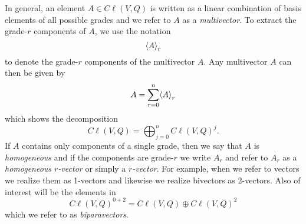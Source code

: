 In general, an element $A \in C\ell(V,Q)$ is written as a linear combination of basis elements of all possible grades and we refer to $A$ as a \emph{multivector}.  To extract the grade-$r$ components of $A$, we use the notation
\begin{equation}
\proj{r}{A}
\end{equation}
to denote the grade-$r$ components of the multivector $A$. Any multivector $A$ can then be given by
\begin{equation}
A = \sum_{r=0}^n \proj{r}{A}
\end{equation}
which shows the decomposition
\begin{equation}
C\ell(V,Q) = \bigoplus_{j=0}^n C\ell(V,Q)^j.
\end{equation}
If $A$ contains only components of a single grade, then we say that $A$ is \emph{homogeneous} and if the components are grade-$r$ we write $A_r$ and refer to $A_r$ as a \emph{homogeneous $r$-vector} or simply a \emph{$r$-vector}.  For example, when we refer to vectors we realize them as 1-vectors and likewise we realize bivectors as 2-vectors. Also of interest will be the elements in
\begin{equation}
 C\ell(V,Q)^{0+2} = C\ell(V,Q)\oplus C\ell(V,Q)^2
\end{equation}
which we refer to as \emph{biparavectors}.

